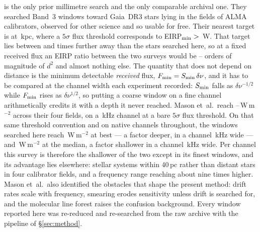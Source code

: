 \citet{Mason2025} is the only prior millimetre search and the only
comparable archival one. They searched Band~3 windows toward
\MasonNStar{} Gaia~DR3 stars lying in the fields of \MasonNCal{} ALMA
calibrators, observed for other science and so usable for free. Their
nearest target is at \MasonNearKpc\,kpc, where a $5\sigma$ flux threshold
corresponds to EIRP$_{\rm min}>{}$\MasonNearEirp\,W. That target lies
between \MasonDistRatioFar{} and \MasonDistRatioNear{} times further away
than the stars searched here, so at a fixed received flux an EIRP ratio
between the two surveys would be
\MasonEirpOrdLo--\MasonEirpOrdHi{} orders of magnitude of $d^{2}$ and
almost nothing else. The quantity
that does not depend on distance is the minimum detectable \emph{received}
flux, $F_{\rm min}=S_{\rm min}\,\delta\nu$, and it has to be compared at
the channel width each experiment recorded: $S_{\rm min}$ falls as
$\delta\nu^{-1/2}$ while $F_{\rm min}$ rises as $\delta\nu^{1/2}$, so
putting a coarse window on a fine channel arithmetically credits it with a
depth it never reached. Mason
et~al.\ reach \MasonFluxLo--\MasonFluxHi\,W\,m$^{-2}$ across their four
fields, on a \MasonChanKHz\,kHz channel at a bare $5\sigma$ flux
threshold. On that same threshold convention and on native channels
throughout, the windows searched here reach \FluxTrigBest\,W\,m$^{-2}$ at
best --- a factor \FluxNatBestRatio{} deeper, in a channel
\FluxChanBestKHz\,kHz wide --- and \FluxTrigMed\,W\,m$^{-2}$ at the
median, a factor \FluxNatMedRatio{} shallower in a channel
\FluxChanMedKHz\,kHz wide. Per channel this survey is therefore the
shallower of the two except in its finest windows, and its advantage lies
elsewhere: \NSysClassA{} stellar systems within 40\,pc rather than distant
stars in four calibrator fields, and a frequency range reaching about nine
times higher. Mason et~al.\ also
identified the obstacles that shape the present method: drift rates scale
with frequency, smearing erodes sensitivity unless drift is searched for,
and the molecular line forest raises the confusion background. Every
window reported here was re-reduced and re-searched from the raw archive
with the pipeline of \S\ref{sec:method}.

